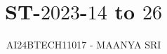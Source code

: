 \documentclass[journal]{IEEEtran}
\begin{document}

\vspace{3cm}

\title{ST-$2023$-$14$ to $26$}
\author{AI24BTECH11017 - MAANYA SRI
}
{\let\newpage\relax\maketitle}

\renewcommand{\thefigure}{\theenumi}
\renewcommand{\thetable}{\theenumi}
\setlength{\intextsep}{10pt} %


\renewcommand{\thetable}{\theenumi}
\end{document}
